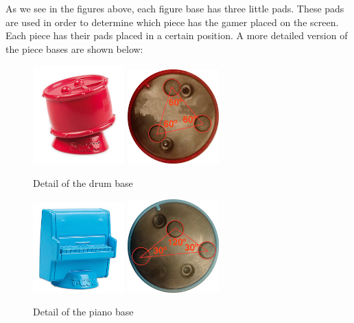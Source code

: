 As we see in the figures above, each figure base has three little pads. These pads are used in order to determine which piece has the gamer placed on the screen. Each piece has their pads placed in a certain position. A more detailed version of the piece bases are shown below:

\begin{figure}[ht!]
	\centering
	\includegraphics[width=100pt]{graphics/architecture/pieces/piecePercussion.jpg}
	\vspace{0.6cm}
	\includegraphics[width=100pt]{graphics/architecture/pieces/percussionBaseAngles.png}
	\caption{Detail of the drum base}
	\label{fig:percussionpiecedetailed}
\end{figure}

\begin{figure}[ht!]
	\centering
	\includegraphics[width=100pt]{graphics/architecture/pieces/pieceKeyboards.jpg}
	\vspace{0.6cm}
	\includegraphics[width=100pt]{graphics/architecture/pieces/keyboardsBaseAngles.png}
	\caption{Detail of the piano base}
	\label{fig:keyboardspiecedetailed}
\end{figure}

